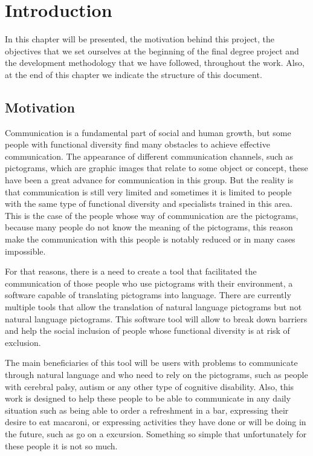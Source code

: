
\chapter{Introduction}
\label{cap:introduction}
 
In this chapter will be presented, the motivation behind this project, the objectives that we set ourselves at the beginning of the final degree project and the development methodology that we have followed, throughout the work. Also, at the end of this chapter we indicate the structure of this document.

\section{Motivation}

Communication is a fundamental part of social and human growth, but some people with functional diversity find many obstacles to achieve effective communication. The appearance of different communication channels, such as pictograms, which are graphic images that relate to some object or concept, these have been a great advance for communication in this group. But the reality is that communication is still very limited and sometimes it is limited to people with the same type of functional diversity and specialists trained in this area. This is the case of the people whose way of communication are the pictograms, because many people do not know the meaning of the pictograms, this reason make the communication with this people is notably reduced or in many cases impossible. 

For that reasons, there is a need to create a tool that facilitated the communication of those people who use pictograms with their environment, a software capable of translating pictograms into language. There are currently multiple tools that allow the translation of natural language pictograms but not natural language pictograms. This software tool will allow to break down barriers and help the social inclusion of people whose functional diversity is at risk of exclusion.


The main beneficiaries of this tool will be users with problems to communicate through natural language and who need to rely on the pictograms, such as people with cerebral palsy, autism or any other type of cognitive disability.
Also, this work is designed to help these people to be able to communicate in any daily situation such as being able to order a refreshment in a bar, expressing their desire to eat macaroni, or expressing activities they have done or will be doing in the future, such as go on a excursion. Something so simple that unfortunately for these people it is not so much.

